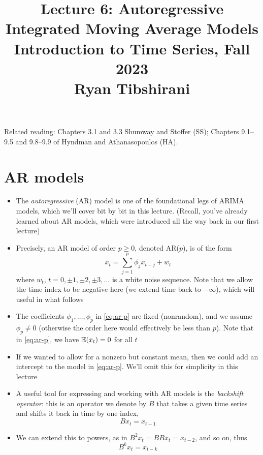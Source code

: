 \documentclass{article}
\title{Lecture 6: Autoregressive Integrated Moving Average Models \\ \smallskip  
\large Introduction to Time Series, Fall 2023 \\ \smallskip
Ryan Tibshirani}
\date{}
\begin{document}
\maketitle
\RaggedRight
\vspace{-50pt}

Related reading: Chapters 3.1 and 3.3 Shumway and Stoffer (SS); Chapters
9.1--9.5 and 9.8--9.9 of Hyndman and Athanasopoulos (HA).   

\section{AR models}

\begin{itemize}
\item The \emph{autoregressive} (AR) model is one of the foundational legs of
  ARIMA models, which we'll cover bit by bit in this lecture. (Recall, you've
  already learned about AR models, which were introduced all the way back in our 
  first lecture)  

\item Precisely, an AR model of order $p \geq 0$, denoted AR($p$), is of the
  form 
  \begin{equation}
  \label{eq:ar-p}
  x_t = \sum_{j=1}^p \phi_j x_{t-j} + w_t
  \end{equation}
  where $w_t$, $t = 0, \pm 1, \pm 2, \pm 3, \dots$ is a white noise
  sequence. Note that we allow the time index to be negative here (we extend
  time back to $-\infty$), which will useful in what follows 

\item The coefficients $\phi_1,\dots,\phi_p$ in \eqref{eq:ar-p} are fixed
  (nonrandom), and we assume $\phi_p \not= 0$ (otherwise the order here would
  effectively be less than $p$). Note that in \eqref{eq:ar-p}, we have $\mathbb{E}(x_t)
  = 0$ for all $t$

\item If we wanted to allow for a nonzero but constant mean, then we could add
  an intercept to the model in \eqref{eq:ar-p}. We'll omit this for simplicity
  in this lecture  

\item A useful tool for expressing and working with AR models is the
  \emph{backshift operator}: this is an operator we denote by $B$ that takes a 
  given time series and shifts it back in time by one index,
  \[
  B x_t = x_{t-1}
  \]

\item We can extend this to powers, as in $B^2 x_t = B B x_t = x_{t-2}$, and so
  on, thus   
  \[
  B^k x_t = x_{t-k} 
  \]


\end{itemize}
\end{document}

